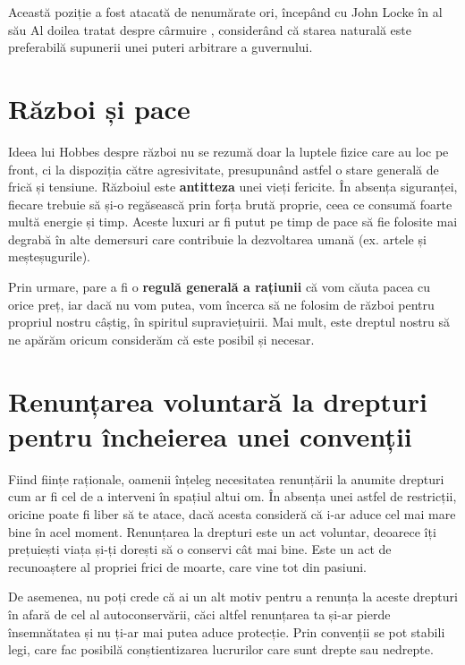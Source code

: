 \documentclass[12pt]{article}
\begin{document}
	 	Această poziție a fost atacată de nenumărate ori, începând cu John Locke în al său \dedouble Al doilea tratat despre cârmuire \sqtworight, considerând că starea naturală este preferabilă supunerii unei puteri arbitrare a guvernului.\par
	 	
	 	\section{Război și pace}
	 	
	 	Ideea lui Hobbes despre război nu se rezumă doar la luptele fizice care au loc pe front, ci la dispoziția către agresivitate, presupunând astfel o stare generală de frică și tensiune. Războiul este \textbf{antitteza} unei vieți fericite. În absența siguranței, fiecare trebuie să și-o regăsească prin forța brută proprie, ceea ce consumă foarte multă energie și timp. Aceste luxuri ar fi putut pe timp de pace să fie folosite mai degrabă în alte demersuri care contribuie la dezvoltarea umană (ex. artele și meșteșugurile).\par
	 	
	 	Prin urmare, pare a fi o \textbf{regulă generală a rațiunii} că vom căuta pacea cu orice preț, iar dacă nu vom putea, vom încerca să ne folosim de război pentru propriul nostru câștig, în spiritul supraviețuirii. Mai mult, este dreptul nostru să ne apărăm oricum considerăm că este posibil și necesar.
	 	
	 	\section{Renunțarea voluntară la drepturi pentru încheierea unei convenții}
	 	Fiind ființe raționale, oamenii înțeleg necesitatea renunțării la anumite drepturi cum ar fi cel de a interveni în spațiul altui om. În absența unei astfel de restricții, oricine poate fi liber să te atace, dacă acesta consideră că i-ar aduce cel mai mare bine în acel moment. Renunțarea la drepturi este un act voluntar, deoarece îți prețuiești viața și-ți dorești să o conservi cât mai bine. Este un act de recunoaștere al propriei frici de moarte, care vine tot din pasiuni.\par
	 	
	 	De asemenea, nu poți crede că ai un alt motiv pentru a renunța la aceste drepturi în afară de cel al autoconservării, căci altfel renunțarea ta și-ar pierde însemnătatea și nu ți-ar mai putea aduce protecție. Prin convenții se pot stabili legi, care fac posibilă conștientizarea lucrurilor care sunt drepte sau nedrepte.\par
	 	
\end{document}
